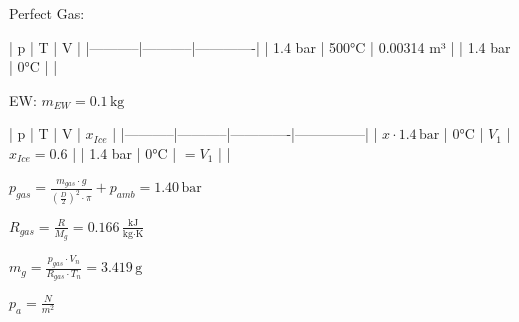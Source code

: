 Perfect Gas:  

| p         | T         | V           |  
|-----------|-----------|-------------|  
| 1.4 bar   | 500°C     | 0.00314 m³  |  
| 1.4 bar   | 0°C       |             |  

EW: \( m_{EW} = 0.1 \, \text{kg} \)  

| p         | T         | V           | \( x_{Ice} \) |  
|-----------|-----------|-------------|---------------|  
| \( x \cdot 1.4 \, \text{bar} \) | 0°C       | \( V_1 \)      | \( x_{Ice} = 0.6 \) |  
| 1.4 bar   | 0°C       | \( = V_1 \) |               |  

\( p_{gas} = \frac{m_{gas} \cdot g}{\left(\frac{D}{2}\right)^2 \cdot \pi} + p_{amb} = 1.40 \, \text{bar} \)  

\( R_{gas} = \frac{R}{M_g} = 0.166 \, \frac{\text{kJ}}{\text{kg·K}} \)  

\( m_g = \frac{p_{gas} \cdot V_n}{R_{gas} \cdot T_n} = 3.419 \, \text{g} \)  

\( p_a = \frac{N}{m^2} \)